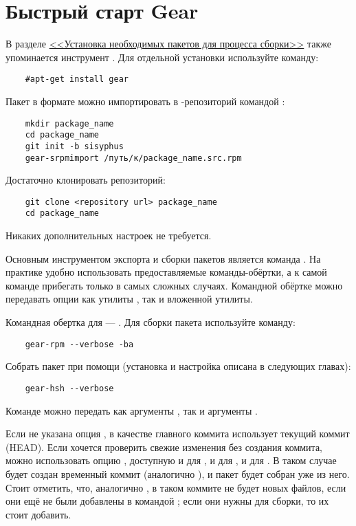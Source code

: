 \section{Быстрый старт Gear}

В разделе \hyperlink{1.3}{<<Установка необходимых пакетов для процесса сборки>>} 
также упоминается инструмент . Для отдельной установки используйте команду: 
\begin{verbatim}
	#apt-get install gear
\end{verbatim}


Пакет в формате  можно импортировать в -репозиторий командой :
\begin{verbatim}
	mkdir package_name
	cd package_name
	git init -b sisyphus
	gear-srpmimport /путь/к/package_name.src.rpm
\end{verbatim}


Достаточно клонировать репозиторий: 
\begin{verbatim}
	git clone <repository url> package_name
	cd package_name
\end{verbatim}

Никаких дополнительных настроек не требуется.


Основным инструментом экспорта и сборки пакетов является команда . На практике удобно 
использовать предоставляемые команды-обёртки, а к самой команде  прибегать только в 
самых сложных случаях. Командной обёртке можно передавать опции как утилиты , так и 
вложенной утилиты.

Командная обертка  для  --- . Для сборки пакета используйте команду: 
\begin{verbatim}
	gear-rpm --verbose -ba
\end{verbatim}


Собрать пакет при помощи  (установка и настройка  описана в следующих главах): 
\begin{verbatim}
	gear-hsh --verbose
\end{verbatim}

Команде  можно передать как аргументы , так и аргументы .

Если не указана опция ,  в качестве главного коммита использует текущий 
коммит (HEAD). Если хочется проверить свежие изменения без создания коммита, можно использовать опцию 
, доступную и для , и для , и для . В таком случае 
будет создан временный коммит (аналогично ), и пакет будет собран уже из него. 
Стоит отметить, что, аналогично , в таком коммите не будет новых файлов, если они 
ещё не были добавлены в  командой ; если они нужны для сборки, то их стоит добавить. 

